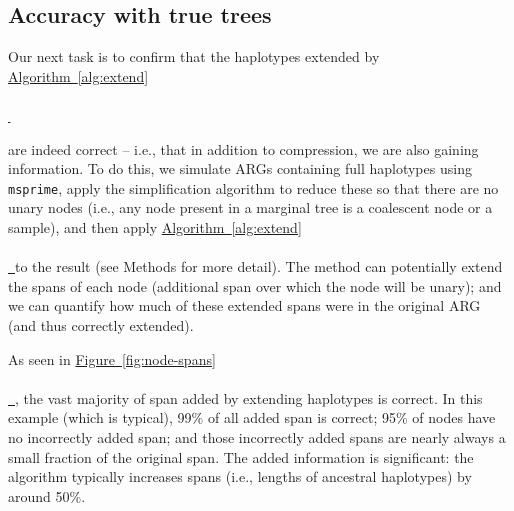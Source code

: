 \documentclass[10pt,twoside,lineno]{gsajnl}
\newcommand{\msprime}{\texttt{msprime}}
\newcommand{\algorithmref}[2][]{%
	\hyperref[{#2}]{%
		Algorithm~\ref*{#2}%
		\ifx\\#1\\%
		\else
		\,#1%
		\fi
	}%
}
\newcommand*{\figref}[2][]{%
	\hyperref[{#2}]{%
		Figure~\ref*{#2}%
		\ifx\\#1\\%
		\else
		\,#1%
		\fi
	}%
}
\begin{document}
\subsection{Accuracy with true trees}

Our next task is to confirm that the haplotypes extended by \algorithmref{alg:extend}
are indeed correct -- i.e., that in addition to compression, we are also gaining information.
To do this, 
we simulate ARGs containing full haplotypes using \msprime{},
apply the simplification algorithm to reduce these so that there are no unary nodes
(i.e., any node present in a marginal tree is a coalescent node or a sample),
and then apply \algorithmref{alg:extend} to the result
(see Methods for more detail).
The method can potentially extend the spans of each node
(additional span over which the node will be unary);
and we can quantify how much of these extended spans were in the original ARG
(and thus correctly extended).

%
%

As seen in \figref{fig:node-spans},
the vast majority of span added by extending haplotypes is correct.
In this example (which is typical),
99\% of all added span is correct;
95\% of nodes have no incorrectly added span;
and those incorrectly added spans are nearly always a small fraction of the original span.
The added information is significant:
the algorithm typically increases spans (i.e., lengths of ancestral haplotypes)
by around 50\%.
\end{document}

